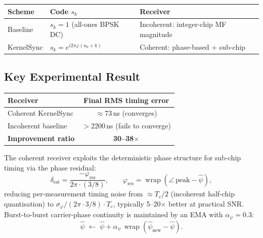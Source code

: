 \documentclass[12pt,a4paper]{article}
\theoremstyle{plain}
\theoremstyle{definition}
\theoremstyle{remark}
\begin{document}
\begin{center}
\renewcommand{\arraystretch}{1.2}
\begin{tabular}{@{}lll@{}}
\toprule
Scheme & Code $s_k$ & Receiver\\
\midrule
Baseline
  & $s_k = 1$ (all-ones BPSK DC)
  & Incoherent: integer-chip MF magnitude\\
KernelSync
  & $s_k = e^{i2\pi\varphi(n_0+k)}$
  & Coherent: phase-based + sub-chip\\
\bottomrule
\end{tabular}
\end{center}

\subsection{Key Experimental Result}

\begin{center}
\renewcommand{\arraystretch}{1.2}
\begin{tabular}{@{}lc@{}}
\toprule
Receiver & Final RMS timing error\\
\midrule
Coherent KernelSync   & $\approx 73$\,ns (converges)\\
Incoherent baseline   & $>2200$\,ns (fails to converge)\\
\textbf{Improvement ratio} & \textbf{30--38$\boldsymbol\times$}\\
\bottomrule
\end{tabular}
\end{center}

\noindent The coherent receiver exploits the deterministic phase structure for
sub-chip timing via the phase residual:
\begin{equation}
  \delta_{\mathrm{est}}
  = \frac{-\varphi_{\mathrm{res}}}{2\pi \cdot (3/8)},
  \qquad
  \varphi_{\mathrm{res}} = \operatorname{wrap}(\angle\,\mathrm{peak} - \hat\psi),
  \label{eq:ks-subchip}
\end{equation}
reducing per-measurement timing noise from $\approx T_c/2$ (incoherent
half-chip quantisation) to
$\sigma_\varphi / (2\pi \cdot 3/8) \cdot T_c$, typically 5--20$\times$
better at practical SNR.  Burst-to-burst carrier-phase continuity is
maintained by an EMA with $\alpha_\psi = 0.3$:
\begin{equation}
  \hat\psi \;\leftarrow\;
  \hat\psi + \alpha_\psi\,\operatorname{wrap}(\hat\psi_{\mathrm{new}} - \hat\psi).
  \label{eq:ks-ema-carrier}
\end{equation}
\end{document}
